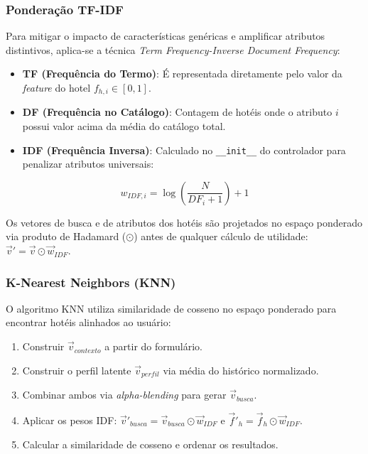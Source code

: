 \documentclass[10pt,twocolumn,letterpaper]{article}
\begin{document}
\subsubsection{Ponderação TF-IDF}

Para mitigar o impacto de características genéricas e amplificar atributos distintivos, aplica-se a técnica \textit{Term Frequency-Inverse Document Frequency}:
\begin{itemize}
    \item \textbf{TF (Frequência do Termo)}: É representada diretamente pelo valor da \textit{feature} do hotel $f_{h,i} \in [0,1]$.
    \item \textbf{DF (Frequência no Catálogo)}: Contagem de hotéis onde o atributo $i$ possui valor acima da média do catálogo total.
    \item \textbf{IDF (Frequência Inversa)}: Calculado no \texttt{\_\_init\_\_} do controlador para penalizar atributos universais:
\end{itemize}

\begin{equation}
w_{IDF,i} = \log\left(\frac{N}{DF_i + 1}\right) + 1
\end{equation}

Os vetores de busca e de atributos dos hotéis são projetados no espaço ponderado via produto de Hadamard ($\odot$) antes de qualquer cálculo de utilidade: $\vec{v}' = \vec{v} \odot \vec{w}_{IDF}$.

\subsubsection{K-Nearest Neighbors (KNN)}

O algoritmo KNN utiliza similaridade de cosseno no espaço ponderado para encontrar hotéis alinhados ao usuário:

\begin{enumerate}
    \item Construir $\vec{v}_{contexto}$ a partir do formulário.
    \item Construir o perfil latente $\vec{v}_{perfil}$ via média do histórico normalizado.
    \item Combinar ambos via \textit{alpha-blending} para gerar $\vec{v}_{busca}$.
    \item Aplicar os pesos IDF: $\vec{v}'_{busca} = \vec{v}_{busca} \odot \vec{w}_{IDF}$ e $\vec{f}'_{h} = \vec{f}_{h} \odot \vec{w}_{IDF}$.
    \item Calcular a similaridade de cosseno e ordenar os resultados.
\end{enumerate}
\end{document}

